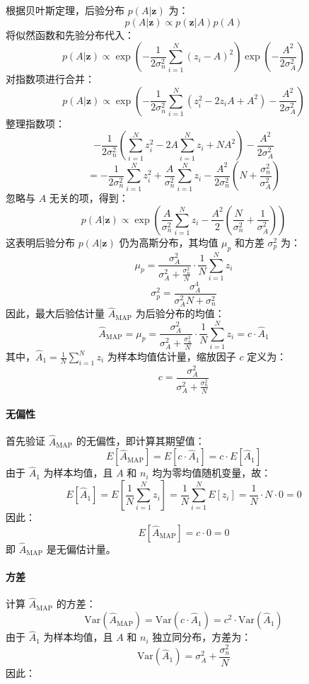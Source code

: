 \documentclass[12pt]{ctexart}
\begin{document}
根据贝叶斯定理，后验分布 \( p(A | \mathbf{z}) \) 为：
\[
p(A | \mathbf{z}) \propto p(\mathbf{z} | A) p(A)
\]
将似然函数和先验分布代入：
\[
p(A | \mathbf{z}) \propto \exp\left( -\frac{1}{2\sigma_n^2} \sum_{i=1}^{N} (z_i - A)^2 \right) \exp\left( -\frac{A^2}{2\sigma_A^2} \right)
\]
对指数项进行合并：
\[
p(A | \mathbf{z}) \propto \exp\left( -\frac{1}{2\sigma_n^2} \sum_{i=1}^{N} (z_i^2 - 2z_i A + A^2) - \frac{A^2}{2\sigma_A^2} \right)
\]
整理指数项：
\[
-\frac{1}{2\sigma_n^2} \left( \sum_{i=1}^{N} z_i^2 - 2A \sum_{i=1}^{N} z_i + N A^2 \right) - \frac{A^2}{2\sigma_A^2}
\]
\[
= -\frac{1}{2\sigma_n^2} \sum_{i=1}^{N} z_i^2 + \frac{A}{\sigma_n^2} \sum_{i=1}^{N} z_i - \frac{A^2}{2\sigma_n^2} \left( N + \frac{\sigma_n^2}{\sigma_A^2} \right)
\]
忽略与 \( A \) 无关的项，得到：
\[
p(A | \mathbf{z}) \propto \exp\left( \frac{A}{\sigma_n^2} \sum_{i=1}^{N} z_i - \frac{A^2}{2} \left( \frac{N}{\sigma_n^2} + \frac{1}{\sigma_A^2} \right) \right)
\]
这表明后验分布 \( p(A | \mathbf{z}) \) 仍为高斯分布，其均值 \( \mu_p \) 和方差 \( \sigma_p^2 \) 为：
\[
\mu_p = \frac{\sigma_A^2}{\sigma_A^2 + \frac{\sigma_n^2}{N}} \cdot \frac{1}{N} \sum_{i=1}^{N} z_i
\]
\[
\sigma_p^2 = \frac{\sigma_A^4}{\sigma_A^2 N + \sigma_n^2}
\]
因此，最大后验估计量 \( \hat{A}_{\text{MAP}} \) 为后验分布的均值：
\[
\hat{A}_{\text{MAP}} = \mu_p = \frac{\sigma_A^2}{\sigma_A^2 + \frac{\sigma_n^2}{N}} \cdot \frac{1}{N} \sum_{i=1}^{N} z_i = c \cdot \hat{A}_1
\]
其中，\( \hat{A}_1 = \frac{1}{N} \sum_{i=1}^{N} z_i \) 为样本均值估计量，缩放因子 \( c \) 定义为：
\[
c = \frac{\sigma_A^2}{\sigma_A^2 + \frac{\sigma_n^2}{N}}
\]

\paragraph{无偏性}

首先验证 \( \hat{A}_{\text{MAP}} \) 的无偏性，即计算其期望值：
\[
E[\hat{A}_{\text{MAP}}] = E\left[ c \cdot \hat{A}_1 \right] = c \cdot E\left[ \hat{A}_1 \right]
\]
由于 \( \hat{A}_1 \) 为样本均值，且 \( A \) 和 \( n_i \) 均为零均值随机变量，故：
\[
E[\hat{A}_1] = E\left[ \frac{1}{N} \sum_{i=1}^{N} z_i \right] = \frac{1}{N} \sum_{i=1}^{N} E[z_i] = \frac{1}{N} \cdot N \cdot 0 = 0
\]
因此：
\[
E[\hat{A}_{\text{MAP}}] = c \cdot 0 = 0
\]
即 \( \hat{A}_{\text{MAP}} \) 是无偏估计量。

\paragraph{方差}

计算 \( \hat{A}_{\text{MAP}} \) 的方差：
\[
\text{Var}(\hat{A}_{\text{MAP}}) = \text{Var}\left( c \cdot \hat{A}_1 \right) = c^2 \cdot \text{Var}(\hat{A}_1)
\]
由于 \( \hat{A}_1 \) 为样本均值，且 \( A \) 和 \( n_i \) 独立同分布，方差为：
\[
\text{Var}(\hat{A}_1) = \sigma_A^2 + \frac{\sigma_n^2}{N}
\]
因此：
\end{document}
